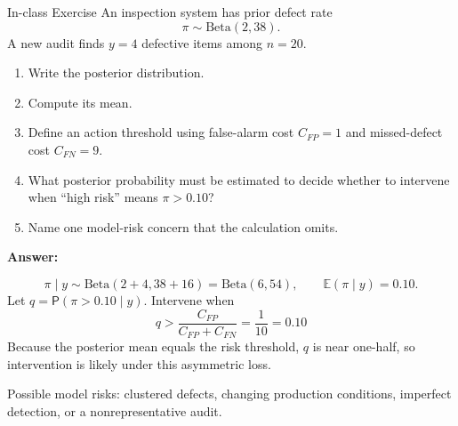 \documentclass[aspectratio=43,11pt]{beamer}
\newcommand{\prob}{\mathsf{P}}
\newcommand{\E}{\mathbb{E}}
\begin{document}

{
  \begin{frame}{In-class Exercise}
    An inspection system has prior defect rate
    \[
    \pi\sim\mathrm{Beta}(2,38).
    \]
    A new audit finds $y=4$ defective items among $n=20$.
    \begin{enumerate}
      \item Write the posterior distribution.
      \item Compute its mean.
      \item Define an action threshold using false-alarm cost $C_{FP}=1$ and missed-defect cost $C_{FN}=9$.
      \item What posterior probability must be estimated to decide whether to intervene when ``high risk'' means $\pi>0.10$?
      \item Name one model-risk concern that the calculation omits.
    \end{enumerate}
  \end{frame}

  \begin{frame}{}
    \textbf{Answer:}
    {\color{blue}
    \[
    \pi\mid y\sim\mathrm{Beta}(2+4,38+16)=\mathrm{Beta}(6,54),
    \qquad \E(\pi\mid y)=0.10.
    \]
    Let $q=\prob(\pi>0.10\mid y)$. Intervene when
    \[
    q>\frac{C_{FP}}{C_{FP}+C_{FN}}=\frac{1}{10}=0.10
    \]
    Because the posterior mean equals the risk threshold, $q$ is near one-half, so intervention is likely under this asymmetric loss.

    \vspace{0.5em}
    Possible model risks: clustered defects, changing production conditions, imperfect detection, or a nonrepresentative audit.
  }
\end{frame}
}
\end{document}
